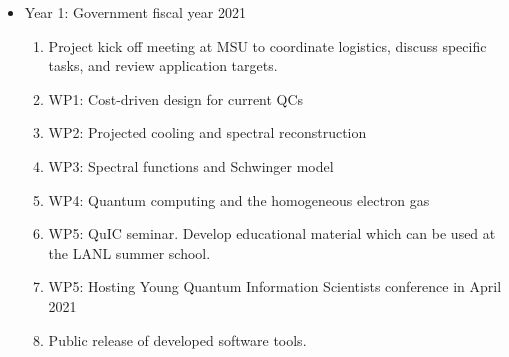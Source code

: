 \documentclass[11pt]{article}
\begin{document}
\begin{itemize}
    \item Year 1: Government fiscal year 2021
    \begin{enumerate}
        \item Project kick off meeting at MSU to coordinate logistics, discuss
specific tasks, and review application targets.
\item WP1: Cost-driven design for current QCs
\item WP2: Projected cooling and spectral reconstruction
\item WP3: Spectral functions and Schwinger model
\item WP4: Quantum computing and the homogeneous electron gas
\item WP5:  QuIC seminar. Develop educational material which can be used at the LANL summer school.
\item WP5:  Hosting Young Quantum Information Scientists conference in April 2021
\item Public release of developed software tools.


\end{enumerate}
\end{itemize}
\end{document}
